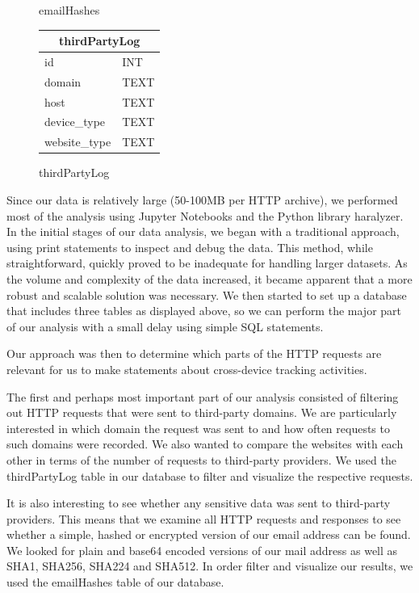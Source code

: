 \begin{figure}[ht]
\begin{subtable}[b]{0.3\textwidth}
        \caption{emailHashes}
    \end{subtable}
    \hfill
    \begin{subtable}[b]{0.3\textwidth}
        \centering
        \begin{tabular}{|l|l|}
            \hline
            \multicolumn{2}{|c|}{\textbf{thirdPartyLog}} \\
            \hline
            id           & INT \\
            domain       & TEXT \\
            host         & TEXT \\
            device\_type  & TEXT \\
            website\_type & TEXT \\
            \hline
        \end{tabular}
        \caption{thirdPartyLog}
    \end{subtable}
\end{figure}
Since our data is relatively large (50-100MB per HTTP archive), we performed most of the analysis using Jupyter Notebooks and the Python library haralyzer. In the initial stages of our data analysis, we began with a traditional approach, using print statements to inspect and debug the data. This method, while straightforward, quickly proved to be inadequate for handling larger datasets. As the volume and complexity of the data increased, it became apparent that a more robust and scalable solution was necessary. We then started to set up a database that includes three tables as displayed above, so we can perform the major part of our analysis with a small delay using simple SQL statements.

Our approach was then to determine which parts of the HTTP requests are relevant for us to make statements about cross-device tracking activities.

The first and perhaps most important part of our analysis consisted of filtering out HTTP requests that were sent to third-party domains. We are particularly interested in which domain the request was sent to and how often requests to such domains were recorded. We also wanted to compare the websites with each other in terms of the number of requests to third-party providers. We used the thirdPartyLog table in our database to filter and visualize the respective requests.

It is also interesting to see whether any sensitive data was sent to third-party providers. This means that we examine all HTTP requests and responses to see whether a simple, hashed or encrypted version of our email address can be found. We looked for plain and base64 encoded versions of our mail address as well as SHA1, SHA256, SHA224 and SHA512. In order filter and visualize our results, we used the emailHashes table of our database.

